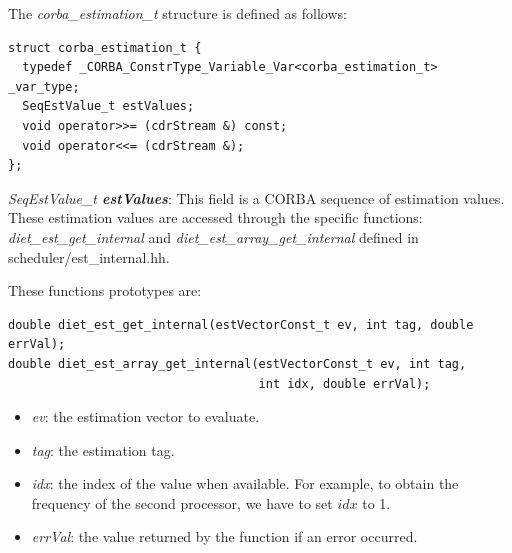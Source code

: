 \noindent The \textit{corba\_estimation\_t} structure is defined as follows:
\begin{verbatim}
struct corba_estimation_t {
  typedef _CORBA_ConstrType_Variable_Var<corba_estimation_t> _var_type;
  SeqEstValue_t estValues;
  void operator>>= (cdrStream &) const;
  void operator<<= (cdrStream &);
};
\end{verbatim}
\textit{SeqEstValue\_t \bf estValues}: This field is a CORBA sequence of
estimation values. These estimation values are accessed through the specific
functions: \textit{diet\_est\_get\_internal} and \linebreak
\textit{diet\_est\_array\_get\_internal} defined in scheduler/est\_internal.hh.

\noindent These functions prototypes are:
\begin{verbatim}
double diet_est_get_internal(estVectorConst_t ev, int tag, double errVal);
double diet_est_array_get_internal(estVectorConst_t ev, int tag,
                                   int idx, double errVal);
\end{verbatim}
\begin{itemize}
  \item \textit{ev}: the estimation vector to evaluate.
  \item \textit{tag}: the estimation tag.
  \item \textit{idx}: the index of the value when available. For example, to
    obtain the frequency of the second processor, we have to set $idx$ to 1.
  \item \textit{errVal}: the value returned by the function if an error
    occurred.
\end{itemize}

